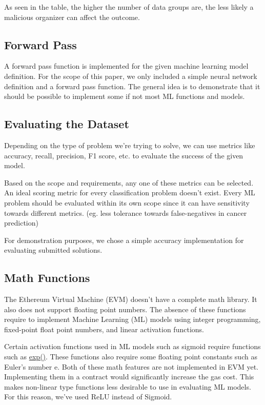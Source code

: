 \documentclass{article}
\begin{document}
As seen in the table, the higher the number of data groups are, the less likely a malicious organizer can affect the outcome.

\subsection{Forward Pass}

A forward pass function is implemented for the given machine learning model definition. For the scope of this paper, we only included a simple neural network definition and a forward pass function. The general idea is to demonstrate that it should be possible to implement some if not most ML functions and models.

\subsection{Evaluating the Dataset}

Depending on the type of problem we’re trying to solve, we can use metrics like accuracy, recall, precision, F1 score, etc. to evaluate the success of the given model.

Based on the scope and requirements, any one of these metrics can be selected. An ideal scoring metric for every classification problem doesn’t exist. Every ML problem should be evaluated within its own scope since it can have sensitivity towards different metrics. (eg. less tolerance towards false-negatives in cancer prediction)

For demonstration purposes, we chose a simple accuracy implementation for evaluating submitted solutions.

\subsection{Math Functions}

The Ethereum Virtual Machine (EVM) doesn’t have a complete math library. It also does not support floating point numbers. The absence of these functions require to implement Machine Learning (ML) models using integer programming, fixed-point float point numbers, and linear activation functions.

Certain activation functions used in ML models such as sigmoid require functions such as \underline{exp()}. These functions also require some floating point constants such as Euler's number e. Both of these math features are not implemented in EVM yet. Implementing them in a contract would significantly increase the gas cost. This makes non-linear type functions less desirable to use in evaluating ML models. For this reason, we’ve used ReLU instead of Sigmoid.
\end{document}
